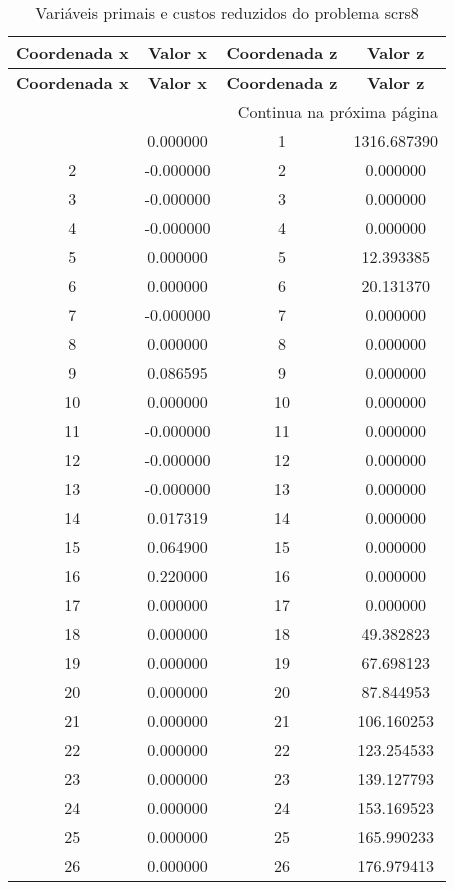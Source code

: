 \documentclass[12pt]{article}
\begin{document}
\begin{longtable}{@{}cccc@{}}
\caption{Variáveis primais e custos reduzidos do problema scrs8} \\
\toprule
\textbf{Coordenada x} & \textbf{Valor x} & \textbf{Coordenada z} & \textbf{Valor z} \\
\midrule
\endfirsthead

\toprule
\textbf{Coordenada x} & \textbf{Valor x} & \textbf{Coordenada z} & \textbf{Valor z} \\
\midrule
\endhead

\midrule \multicolumn{4}{r}{{Continua na próxima página}} \\ \midrule
\endfoot

\bottomrule
\endlastfoot
1 & 0.000000 & 1 & 1316.687390 \\
2 & -0.000000 & 2 & 0.000000 \\
3 & -0.000000 & 3 & 0.000000 \\
4 & -0.000000 & 4 & 0.000000 \\
5 & 0.000000 & 5 & 12.393385 \\
6 & 0.000000 & 6 & 20.131370 \\
7 & -0.000000 & 7 & 0.000000 \\
8 & 0.000000 & 8 & 0.000000 \\
9 & 0.086595 & 9 & 0.000000 \\
10 & 0.000000 & 10 & 0.000000 \\
11 & -0.000000 & 11 & 0.000000 \\
12 & -0.000000 & 12 & 0.000000 \\
13 & -0.000000 & 13 & 0.000000 \\
14 & 0.017319 & 14 & 0.000000 \\
15 & 0.064900 & 15 & 0.000000 \\
16 & 0.220000 & 16 & 0.000000 \\
17 & 0.000000 & 17 & 0.000000 \\
18 & 0.000000 & 18 & 49.382823 \\
19 & 0.000000 & 19 & 67.698123 \\
20 & 0.000000 & 20 & 87.844953 \\
21 & 0.000000 & 21 & 106.160253 \\
22 & 0.000000 & 22 & 123.254533 \\
23 & 0.000000 & 23 & 139.127793 \\
24 & 0.000000 & 24 & 153.169523 \\
25 & 0.000000 & 25 & 165.990233 \\
26 & 0.000000 & 26 & 176.979413 \\

\end{longtable}
\end{document}
